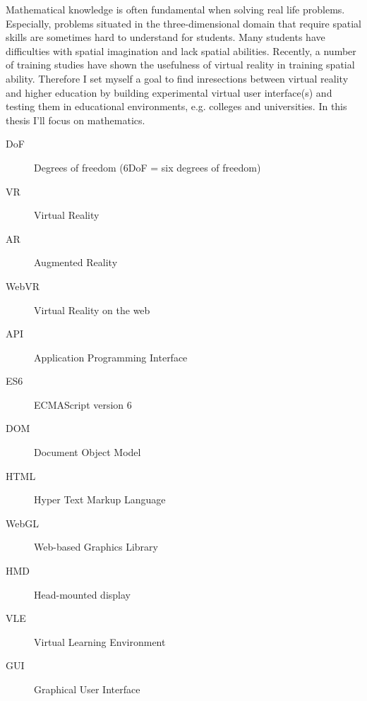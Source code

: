 \documentclass[]{tukethesis}
\begin{document}
\preface %
Mathematical knowledge is often fundamental when solving real life problems. Especially, problems situated in the three-dimensional domain that require spatial skills are sometimes hard to understand for students. Many students have difficulties with spatial imagination and lack spatial abilities. Recently, a number of training studies have shown the usefulness of virtual reality in training spatial ability. Therefore I set myself a goal to find inresections between virtual reality and higher education by building experimental virtual user interface(s) and testing them in educational environments, e.g. colleges and universities. In this thesis I'll focus on mathematics.
\endpreface

\thispagestyle{empty}
\tableofcontents
\newpage

\thispagestyle{empty}
\listoffigures
\newpage


\thispagestyle{empty}

\listofterms %

\begin{description}
\item[DoF] Degrees of freedom (6DoF = six degrees of freedom)
\item[VR] Virtual Reality
\item[AR] Augmented Reality
\item[WebVR] Virtual Reality on the web
\item[API] Application Programming Interface
\item[ES6] ECMAScript version 6
\item[DOM] Document Object Model
\item[HTML]Hyper Text Markup Language
\item[WebGL] Web-based Graphics Library
\item[HMD] Head-mounted display
\item[VLE] Virtual Learning Environment
\item[GUI] Graphical User Interface
\end{description}

\endlistofterms


\newpage
\lstlistoflistings


%

%

%
%
%

%

%

%

%

%

%

%

%
\end{document}
